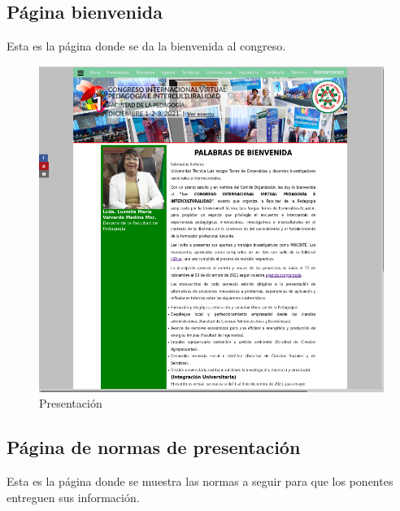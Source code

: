\documentclass[a4paper,14px]{article}
\begin{document}
\newpage
\subsection{Página bienvenida }
\label{sec:pagina-principal}

Esta es la página donde se da la bienvenida al congreso.


\begin{figure}[H]
  \centering
  \includegraphics[scale=0.6]{presentacion.png}
  \caption{Presentación}
  \label{fig:arquitectura}
\end{figure}

\newpage
\subsection{Página de normas de presentación }
\label{sec:pagina-principal}

Esta es la página  donde se muestra las normas a seguir para que los ponentes entreguen sus información.
\end{document}
